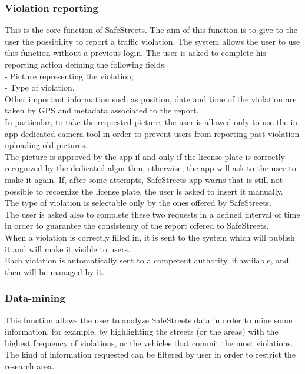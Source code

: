 \documentclass{article}
\begin{document}
			\subsubsection{Violation reporting}
				This is the core function of SafeStreets. The aim of this function is to give to the user the possibility to report a traffic violation. The system allows the user to use this function without a previous login. The user is asked to complete his reporting action defining the following fields:\\
				- Picture representing the violation;\\
				- Type of violation.\\
				Other important information such as position, date and time of the violation are taken by GPS and metadata associated to the report.\\
				In particular, to take the requested picture, the user is allowed only to use the in-app dedicated camera tool in order to prevent users from reporting past violation uploading old pictures.\\ The picture is approved by the app if and only if the license plate is correctly recognized by the dedicated algorithm, otherwise, the app will ask to the user to make it again. If, after some attempts, SafeStreets app warns that is still not possible to recognize the license plate, the user is asked to insert it manually. \\The type of violation is selectable only by the ones offered by SafeStreets.\\ The user is asked also to complete these two requests in a defined interval of time in order to guarantee the consistency of the report offered to SafeStreets.\\
				When a violation is correctly filled in, it is sent to the system which will publish it and will make it visible to users.\\
				Each violation is automatically sent to a competent authority, if available, and then will be managed by it.
		
		\subsubsection{Data-mining}
			This function allows the user to analyze SafeStreets data in order to mine some information, for example, by highlighting the streets (or the areas) with the highest frequency of violations, or the vehicles that commit the most violations. The kind of information requested can be filtered by user in order to restrict the research area. \\
		
\end{document}
